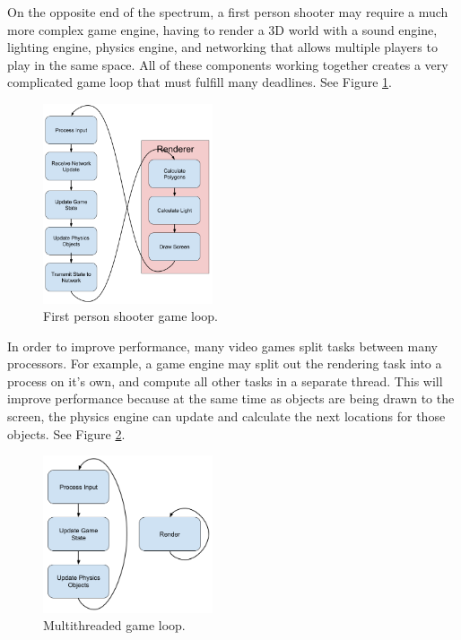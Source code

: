 \documentclass[a4paper, 12pt]{article}
\begin{document}
        On the opposite end of the spectrum, a first person shooter may require a much more complex game engine, having to render a 3D world with a sound engine, lighting engine, physics engine, and networking that allows multiple players to play in the same space. All of these components working together creates a very complicated game loop that must fulfill many deadlines. See Figure \ref{fps_game_loop}.

        \begin{figure}[H]
            \includegraphics[width=5cm]{fps_loop.png}
            \centering
            \caption{First person shooter game loop.}
            \label{fps_game_loop}
        \end{figure}

        In order to improve performance, many video games split tasks between many processors. For example, a game engine may split out the rendering task into a process on it's own, and compute all other tasks in a separate thread. This will improve performance because at the same time as objects are being drawn to the screen, the physics engine can update and calculate the next locations for those objects. See Figure \ref{multithread_loop}.

        \begin{figure}[H]
            \includegraphics[width=5cm]{multithread_loop.png}
            \centering
            \caption{Multithreaded game loop.}
            \label{multithread_loop}
        \end{figure}
\end{document}
